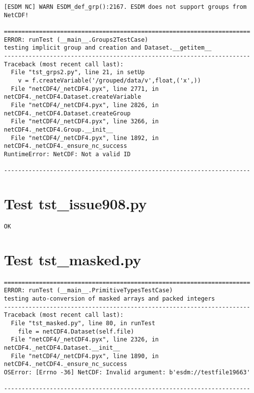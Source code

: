 \begin{verbatim}
[ESDM NC] WARN ESDM_def_grp():2167. ESDM does not support groups from NetCDF!

======================================================================
ERROR: runTest (__main__.Groups2TestCase)
testing implicit group and creation and Dataset.__getitem__
----------------------------------------------------------------------
Traceback (most recent call last):
  File "tst_grps2.py", line 21, in setUp
    v = f.createVariable('/grouped/data/v',float,('x',))
  File "netCDF4/_netCDF4.pyx", line 2771, in netCDF4._netCDF4.Dataset.createVariable
  File "netCDF4/_netCDF4.pyx", line 2826, in netCDF4._netCDF4.Dataset.createGroup
  File "netCDF4/_netCDF4.pyx", line 3266, in netCDF4._netCDF4.Group.__init__
  File "netCDF4/_netCDF4.pyx", line 1892, in netCDF4._netCDF4._ensure_nc_success
RuntimeError: NetCDF: Not a valid ID

----------------------------------------------------------------------
\end{verbatim}

\section{Test tst\_issue908.py}

\begin{verbatim}
OK
\end{verbatim}

\section{Test tst\_masked.py}

\begin{verbatim}
======================================================================
ERROR: runTest (__main__.PrimitiveTypesTestCase)
testing auto-conversion of masked arrays and packed integers
----------------------------------------------------------------------
Traceback (most recent call last):
  File "tst_masked.py", line 80, in runTest
    file = netCDF4.Dataset(self.file)
  File "netCDF4/_netCDF4.pyx", line 2326, in netCDF4._netCDF4.Dataset.__init__
  File "netCDF4/_netCDF4.pyx", line 1890, in netCDF4._netCDF4._ensure_nc_success
OSError: [Errno -36] NetCDF: Invalid argument: b'esdm://testfile19663'

----------------------------------------------------------------------
\end{verbatim}

